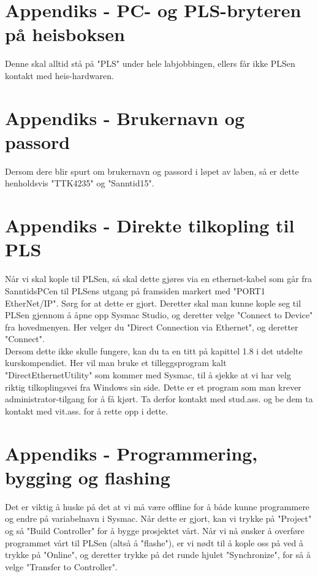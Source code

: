 \appendix
\section{Appendiks - PC- og PLS-bryteren på heisboksen}
Denne skal alltid stå på "PLS" under hele labjobbingen, ellers får ikke PLSen kontakt med heis-hardwaren.

\section{Appendiks - Brukernavn og passord}
Dersom dere blir spurt om brukernavn og passord i løpet av laben, så er dette henholdsvis "TTK4235" og "Sanntid15".

\section{Appendiks - Direkte tilkopling til PLS}
Når vi skal kople til PLSen, så skal dette gjøres via en ethernet-kabel som går fra SanntidsPCen til PLSens utgang på framsiden markert med "PORT1 EtherNet/IP". Sørg for at dette er gjort. Deretter skal man kunne kople seg til PLSen gjennom å åpne opp Sysmac Studio, og deretter velge "Connect to Device" fra hovedmenyen.  Her velger du "Direct Connection via Ethernet", og deretter "Connect".\\

Dersom dette ikke skulle fungere, kan du ta en titt på kapittel 1.8 i det utdelte kurskompendiet. Her vil man bruke et tilleggsprogram kalt "DirectEthernetUtility" som kommer med Sysmac, til å sjekke at vi har velg riktig tilkoplingsvei fra Windows sin side. Dette er et program som man krever administrator-tilgang for å få kjørt. Ta derfor kontakt med stud.ass. og be dem ta kontakt med vit.ass. for å rette opp i dette.

\section{Appendiks - Programmering, bygging og flashing}
Det er viktig å huske på det at vi må være offline for å både kunne programmere og endre på variabelnavn i Sysmac. Når dette er gjort, kan vi trykke på "Project" og så "Build Controller" for å bygge prosjektet vårt. Når vi nå ønsker å overføre programmet vårt til PLSen (altså å "flashe"), er vi nødt til å kople oss på ved å trykke på "Online", og deretter trykke på det runde hjulet "Synchronize", for så å velge "Transfer to Controller".\\

